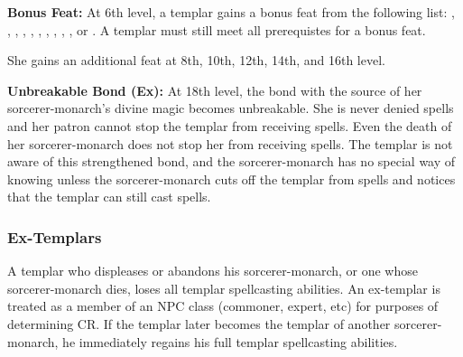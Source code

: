 \textbf{Bonus Feat:} At 6th level, a templar gains a bonus feat from the following list:
,
,
,
,
,
,
,
,
,
,
or .
A templar must still meet all prerequistes for a bonus feat.

She gains an additional feat at 8th, 10th, 12th, 14th, and 16th level.


\textbf{Unbreakable Bond (Ex):} At 18th level, the bond with the source of her sorcerer-monarch's divine magic becomes unbreakable. She is never denied spells and her patron cannot stop the templar from receiving spells. Even the death of her sorcerer-monarch does not stop her from receiving spells. The templar is not aware of this strengthened bond, and the sorcerer-monarch has no special way of knowing unless the sorcerer-monarch cuts off the templar from spells and notices that the templar can still cast spells.



\subsubsection{Ex-Templars}
A templar who displeases or abandons his sorcerer-monarch, or one whose sorcerer-monarch dies, loses all templar spellcasting abilities. An ex-templar is treated as a member of an NPC class (commoner, expert, etc) for purposes of determining CR. If the templar later becomes the templar of another sorcerer-monarch, he immediately regains his full templar spellcasting abilities.





